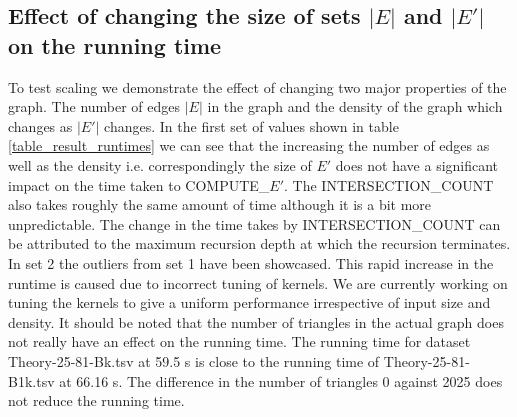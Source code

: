 \documentclass[conference]{IEEEtran}
\begin{document}
\subsection{Effect of changing the size of sets $|E|$ and $|E'|$ on the running time}
To test scaling we demonstrate the effect of changing two major properties of the graph. The number of edges $|E|$ in the graph and the density of the graph which changes as $|E'|$ changes. In the first set of values shown in table \ref{table_result_runtimes} we can see that the increasing the number of edges as well as the density i.e. correspondingly the size of $E'$ does not have a significant impact on the time taken to COMPUTE\_$E'$. The INTERSECTION\_COUNT also takes roughly the same amount of time although it is a bit more unpredictable. The change in the time takes by INTERSECTION\_COUNT can be attributed to the maximum recursion depth at which the recursion terminates. In set 2 the outliers from set 1 have been showcased. This rapid increase in the runtime is caused due to incorrect tuning of kernels. We are currently working on tuning the kernels to give a uniform performance irrespective of input size and density. It should be noted that the number of triangles in the actual graph does not really have an effect on the running time. The running time for dataset Theory-25-81-Bk.tsv at 59.5 s is close to the running time of Theory-25-81-B1k.tsv at 66.16 s. The difference in the number of triangles 0 against 2025 does not reduce the running time.
\end{document}
